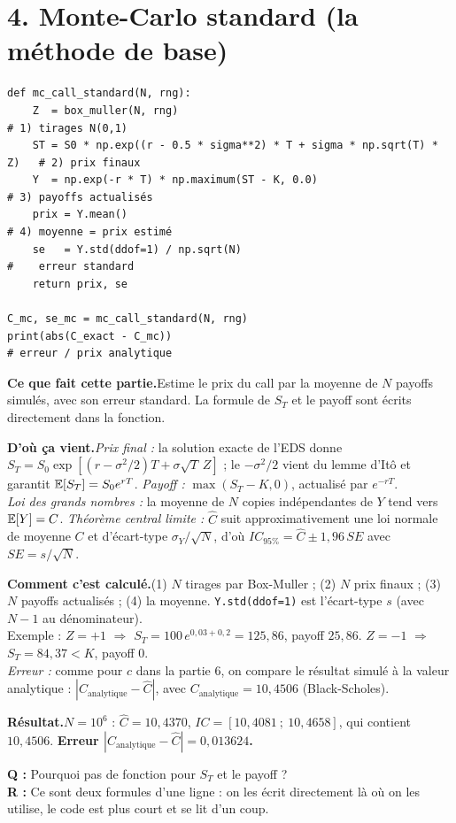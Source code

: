 \documentclass[11pt,a4paper]{article}
\newcommand{\quoi}[1]{\par\noindent\textbf{\color{bleu}Ce que fait cette partie.}\enspace #1\par}
\newcommand{\source}[1]{\par\noindent\textbf{\color{orange}D'où ça vient.}\enspace #1\par}
\newcommand{\calcul}[1]{\par\noindent\textbf{\color{bleu}Comment c'est calculé.}\enspace #1\par}
\newcommand{\resultat}[1]{\par\noindent\textbf{\color{vert}Résultat.}\enspace #1\par}
\newcommand{\prof}[2]{\begin{tcolorbox}[colback=orange!6,colframe=orange!80,boxrule=0.4pt,arc=2pt,left=5pt,right=5pt,top=2pt,bottom=2pt]\small\textbf{Q :} #1\\[1pt]\textbf{R :} #2\end{tcolorbox}}
\newcommand{\sect}[1]{\clearpage\section{#1}}
\begin{document}
\sect{4. Monte-Carlo standard (la méthode de base)}
\begin{lstlisting}
def mc_call_standard(N, rng):
    Z  = box_muller(N, rng)                                              # 1) tirages N(0,1)
    ST = S0 * np.exp((r - 0.5 * sigma**2) * T + sigma * np.sqrt(T) * Z)   # 2) prix finaux
    Y  = np.exp(-r * T) * np.maximum(ST - K, 0.0)                        # 3) payoffs actualisés
    prix = Y.mean()                                                      # 4) moyenne = prix estimé
    se   = Y.std(ddof=1) / np.sqrt(N)                                    #    erreur standard
    return prix, se

C_mc, se_mc = mc_call_standard(N, rng)
print(abs(C_exact - C_mc))                                               # erreur / prix analytique
\end{lstlisting}
\quoi{Estime le prix du call par la moyenne de $N$ payoffs simulés, avec son erreur standard. La formule de $S_T$ et le payoff sont écrits directement dans la fonction.}
\source{\emph{Prix final :} la solution exacte de l'EDS donne $S_T = S_0\exp[(r-\sigma^2/2)T + \sigma\sqrt T\,Z]$ ; le $-\sigma^2/2$ vient du lemme d'Itô et garantit $\mathbb{E}[S_T] = S_0e^{rT}$. \emph{Payoff :} $\max(S_T-K,0)$, actualisé par $e^{-rT}$.\\
\emph{Loi des grands nombres :} la moyenne de $N$ copies indépendantes de $Y$ tend vers $\mathbb{E}[Y] = C$. \emph{Théorème central limite :} $\hat C$ suit approximativement une loi normale de moyenne $C$ et d'écart-type $\sigma_Y/\sqrt N$, d'où $IC_{95\%} = \hat C\pm1{,}96\,SE$ avec $SE = s/\sqrt N$.}
\calcul{(1) $N$ tirages par Box-Muller ; (2) $N$ prix finaux ; (3) $N$ payoffs actualisés ; (4) la moyenne. \texttt{Y.std(ddof=1)} est l'écart-type $s$ (avec $N-1$ au dénominateur).\\
Exemple : $Z = +1$ $\Rightarrow$ $S_T = 100\,e^{0{,}03+0{,}2} = 125{,}86$, payoff $25{,}86$. $Z = -1$ $\Rightarrow$ $S_T = 84{,}37<K$, payoff $0$.\\
\emph{Erreur :} comme pour $c$ dans la partie 6, on compare le résultat simulé à la valeur analytique : $|C_{\text{analytique}} - \hat C|$, avec $C_{\text{analytique}} = 10{,}4506$ (Black-Scholes).}
\resultat{$N = 10^6$ : $\hat C = 10{,}4370$, $IC = [10{,}4081\ ;\ 10{,}4658]$, qui contient $10{,}4506$. \textbf{Erreur $|C_{\text{analytique}} - \hat C| = 0{,}013624$.}}
\prof{Pourquoi pas de fonction pour $S_T$ et le payoff ?}{Ce sont deux formules d'une ligne : on les écrit directement là où on les utilise, le code est plus court et se lit d'un coup.}
\end{document}
